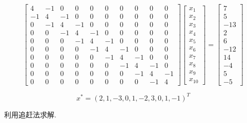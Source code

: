 \[
    \begin{bmatrix}
        4  & -1 & 0  & 0  & 0  & 0  & 0  & 0  & 0  & 0  \\
        -1 & 4  & -1 & 0  & 0  & 0  & 0  & 0  & 0  & 0  \\
        0  & -1 & 4  & -1 & 0  & 0  & 0  & 0  & 0  & 0  \\
        0  & 0  & -1 & 4  & -1 & 0  & 0  & 0  & 0  & 0  \\
        0  & 0  & 0  & -1 & 4  & -1 & 0  & 0  & 0  & 0  \\
        0  & 0  & 0  & 0  & -1 & 4  & -1 & 0  & 0  & 0  \\
        0  & 0  & 0  & 0  & 0  & -1 & 4  & -1 & 0  & 0  \\
        0  & 0  & 0  & 0  & 0  & 0  & -1 & 4  & -1 & 0  \\
        0  & 0  & 0  & 0  & 0  & 0  & 0  & -1 & 4  & -1 \\
        0  & 0  & 0  & 0  & 0  & 0  & 0  & 0  & -1 & 4
    \end{bmatrix}
    \begin{bmatrix}
        x_1 \\
        x_2 \\
        x_3 \\
        x_4 \\
        x_5 \\
        x_6 \\
        x_7 \\
        x_8 \\
        x_9 \\
        x_{10}
    \end{bmatrix}
    =
    \begin{bmatrix}
        7   \\
        5   \\
        -13 \\
        2   \\
        6   \\
        -12 \\
        14  \\
        -4  \\
        5   \\
        -5
    \end{bmatrix}
\]

\[ x^* = (2, 1, -3, 0, 1, -2, 3, 0, 1, -1)^T \]

利用追赶法求解.
